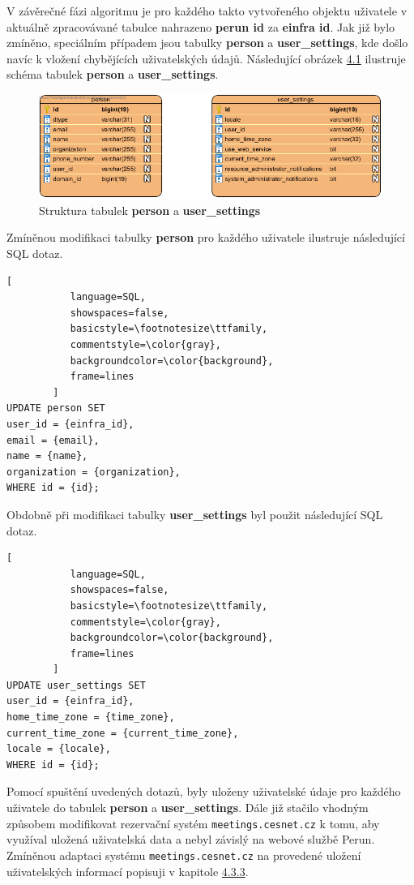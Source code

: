 \documentclass[
  printed, %
  twoside, %
  table,   %
  nolof,     %
  nolot,     %
]{fithesis3}
\begin{document}
V závěrečné fázi algoritmu je pro každého takto vytvořeného objektu uživatele v aktuálně zpracovávané tabulce nahrazeno \textbf{perun id} za \textbf{einfra id}. Jak již bylo zmíněno, speciálním případem jsou tabulky \textbf{person} a \textbf{user\_settings}, kde došlo navíc k vložení chybějících uživatelských údajů. Následující obrázek \hyperref[fig:erd-person-user-settings]{4.1} ilustruje schéma tabulek \textbf{person} a \textbf{user\_settings}. 

\begin{figure}[H]
\label{fig:erd-person-user-settings}
\caption{Struktura tabulek \textbf{person} a \textbf{user\_settings}}
\centering
\includegraphics[width=12.8cm]{pics/erd-person-user_settings} 
\end{figure}
\par 

Zmíněnou modifikaci tabulky \textbf{person} pro každého uživatele ilustruje následující SQL dotaz.

\begin{lstlisting}[
           language=SQL,
           showspaces=false,
           basicstyle=\footnotesize\ttfamily,
           commentstyle=\color{gray},
           backgroundcolor=\color{background},
           frame=lines
        ]
UPDATE person SET 
user_id = {einfra_id},
email = {email},
name = {name},
organization = {organization},
WHERE id = {id};
\end{lstlisting}

Obdobně při modifikaci tabulky \textbf{user\_settings} byl použit následující SQL dotaz. 

\begin{lstlisting}[
           language=SQL,
           showspaces=false,
           basicstyle=\footnotesize\ttfamily,
           commentstyle=\color{gray},
           backgroundcolor=\color{background},
           frame=lines
        ]
UPDATE user_settings SET 
user_id = {einfra_id},
home_time_zone = {time_zone},
current_time_zone = {current_time_zone},
locale = {locale},
WHERE id = {id};
\end{lstlisting}

Pomocí spuštění uvedených dotazů, byly uloženy uživatelské údaje pro každého uživatele do tabulek \textbf{person} a \textbf{user\_settings}. Dále již stačilo vhodným způsobem modifikovat rezervační systém \texttt{meetings.cesnet.cz} k tomu, aby využíval uložená uživatelská data a nebyl závislý na webové službě Perun. Zmíněnou adaptaci systému \texttt{meetings.cesnet.cz} na provedené uložení uživatelských informací popisuji v kapitole \hyperref[ShongoImpl-web]{4.3.3}. 
\end{document}
